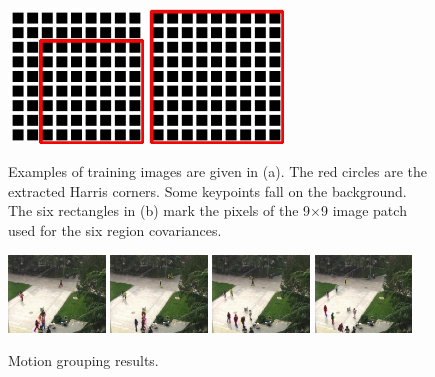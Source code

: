 \documentclass[10pt,twocolumn,letterpaper]{article}
\begin{document}
\begin{figure}
{{\begin{minipage}[b]{0.2\textwidth}
\includegraphics[width=0.32\textwidth,bb=0 0 149 149]{dst4.jpg}
\includegraphics[width=0.32\textwidth,bb=0 0 149 149]{dst1.jpg}
\end{minipage}
}
\label{fig:train:b}
}
\caption{Examples of training images are given in (a). The red circles are the extracted Harris corners. Some keypoints fall on the background. The six rectangles in (b) mark the pixels of the 9$\times$9 image patch used for the six region covariances.}
\label{fig:train}
\end{figure}
\begin{figure}
\centering
\includegraphics[width=0.23\textwidth,bb=0 0 720 576]{a16.jpg}
\includegraphics[width=0.23\textwidth,bb=0 0 720 576]{a26.jpg}
\includegraphics[width=0.23\textwidth,bb=0 0 720 576]{a71.jpg}
\includegraphics[width=0.23\textwidth,bb=0 0 720 576]{a116.jpg}
\caption{Motion grouping results.}
\label{fig:mgr}
\end{figure}
\end{document}
